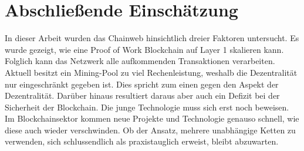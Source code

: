 \section{Abschließende Einschätzung}
In dieser Arbeit wurden das Chainweb hinsichtlich dreier Faktoren untersucht. Es wurde gezeigt, wie eine Proof of Work Blockchain auf Layer 1 skalieren kann. Folglich kann das Netzwerk alle aufkommenden Transaktionen verarbeiten. Aktuell besitzt ein Mining-Pool zu viel Rechenleistung, weshalb die Dezentralität nur eingeschränkt gegeben ist. Dies spricht zum einen gegen den Aspekt der Dezentralität. Darüber hinaus resultiert daraus aber auch ein Defizit bei der Sicherheit der Blockchain. Die junge Technologie muss sich erst noch beweisen. Im Blockchainsektor kommen neue Projekte und Technologie genauso schnell, wie diese auch wieder verschwinden. Ob der Ansatz, mehrere unabhängige Ketten zu verwenden, sich schlussendlich als praxistauglich erweist, bleibt abzuwarten.